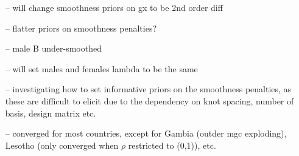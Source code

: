 \documentclass[12pt,a4paper]{article}
\begin{document}
\begin{itemize}
\begin{itemize}
\begin{itemize}
	\end{itemize}
\item[--] will change smoothness priors on gx to be 2nd order diff
\item[--] flatter priors on smoothness penalties? 
\item[--] male B under-smoothed
\item[--] will set males and females lambda to be the same
\item[--] investigating how to set informative priors on the smoothness penalties, as these are difficult to elicit due to the dependency on knot spacing, number of basis, design matrix etc.
\item[--] converged for most countries, except for Gambia (outder mgc exploding), Lesotho (only converged when $\rho$ restricted to (0,1)), etc.
	\end{itemize}
	

\end{itemize}
\end{document}
